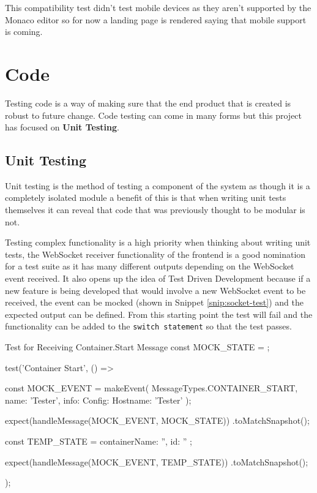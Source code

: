 This compatibility test didn't test mobile devices as they aren't supported by the Monaco editor so for now a landing page is rendered saying that mobile support is coming.

\section{Code}

Testing code is a way of making sure that the end product that is created is robust to future change. Code testing can come in many forms but this project has focused on \textbf{Unit Testing}.

\subsection{Unit Testing}

Unit testing is the method of testing a component of the system as though it is a completely isolated module a benefit of this is that when writing unit tests themselves it can reveal that code that was previously thought to be modular is not. 

Testing complex functionality is a high priority when thinking about writing unit tests, the WebSocket receiver functionality of the frontend is a good nomination for a test suite as it has many different outputs depending on the WebSocket event received. It also opens up the idea of Test Driven Development because if a new feature is being developed that would involve a new WebSocket event to be received, the event can be mocked (shown in Snippet \ref{snip:socket-test}) and the expected output can be defined. From this starting point the test will fail and the functionality can be added to the \texttt{switch statement} so that the test passes.

\begin{sexylisting}[label=snip:socket-test]{Test for Receiving Container.Start Message}
const MOCK_STATE = {};

test('Container Start', () => {
    const MOCK_EVENT = makeEvent(
        MessageTypes.CONTAINER_START, {
            name: 'Tester',
            info: { Config: { Hostname: 'Tester' } }
        });

    expect(handleMessage(MOCK_EVENT, MOCK_STATE))
        .toMatchSnapshot();

    const TEMP_STATE = { containerName: '', id: '' };

    expect(handleMessage(MOCK_EVENT, TEMP_STATE))
        .toMatchSnapshot();
});
\end{sexylisting}

